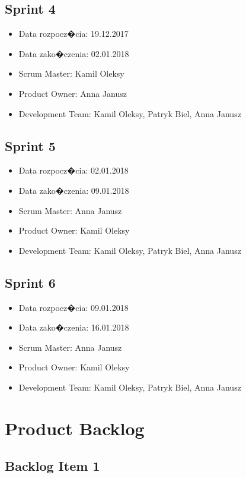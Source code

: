 ﻿\documentclass[a4paper]{article}
\begin{document}
\subsection{Sprint 4}

\begin{itemize}
\item Data rozpocz�cia: 19.12.2017
\item  Data zako�czenia: 02.01.2018
\item Scrum Master: Kamil Oleksy
\item Product Owner: Anna Janusz
\item Development Team: Kamil Oleksy, Patryk Biel, Anna Janusz
\end{itemize}

\subsection{Sprint 5}

\begin{itemize}
\item Data rozpocz�cia: 02.01.2018
\item  Data zako�czenia: 09.01.2018
\item Scrum Master: Anna Janusz
\item Product Owner: Kamil Oleksy
\item Development Team: Kamil Oleksy, Patryk Biel, Anna Janusz
\end{itemize}

\subsection{Sprint 6}

\begin{itemize}
\item Data rozpocz�cia: 09.01.2018
\item  Data zako�czenia: 16.01.2018
\item Scrum Master: Anna Janusz
\item Product Owner: Kamil Oleksy
\item Development Team: Kamil Oleksy, Patryk Biel, Anna Janusz
\end{itemize}


\newpage
\section{Product Backlog}

\subsection{Backlog Item 1} 
\end{document}
